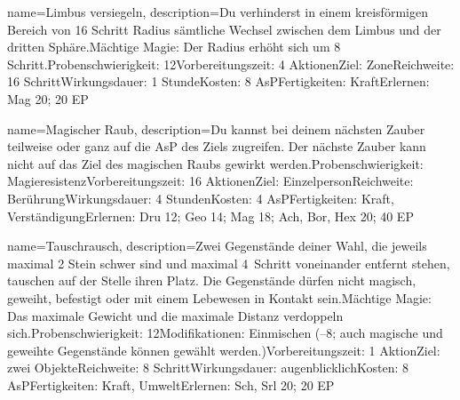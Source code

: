 {
    name={Limbus versiegeln},
    description={Du verhinderst in einem kreisförmigen Bereich von 16 Schritt Radius sämtliche Wechsel zwischen dem Limbus und der dritten Sphäre.\newline Mächtige Magie: Der Radius erhöht sich um 8 Schritt.\newline Probenschwierigkeit: 12\newline Vorbereitungszeit: 4 Aktionen\newline Ziel: Zone\newline Reichweite: 16 Schritt\newline Wirkungsdauer: 1 Stunde\newline Kosten: 8 AsP\newline Fertigkeiten: Kraft\newline Erlernen: Mag 20; 20 EP}
}


{
    name={Magischer Raub},
    description={Du kannst bei deinem nächsten Zauber teilweise oder ganz auf die AsP des Ziels zugreifen. Der nächste Zauber kann nicht auf das Ziel des magischen Raubs gewirkt werden.\newline Probenschwierigkeit: Magieresistenz\newline Vorbereitungszeit: 16 Aktionen\newline Ziel: Einzelperson\newline Reichweite: Berührung\newline Wirkungsdauer: 4 Stunden\newline Kosten: 4 AsP\newline Fertigkeiten: Kraft, Verständigung\newline Erlernen: Dru 12; Geo 14; Mag 18; Ach, Bor, Hex 20; 40 EP}
}


{
    name={Tauschrausch},
    description={Zwei Gegenstände deiner Wahl, die jeweils maximal 2 Stein schwer sind und maximal 4 Schritt voneinander entfernt stehen, tauschen auf der Stelle ihren Platz. Die Gegenstände dürfen nicht magisch, geweiht, befestigt oder mit einem Lebewesen in Kontakt sein.\newline Mächtige Magie: Das maximale Gewicht und die maximale Distanz verdoppeln sich.\newline Probenschwierigkeit: 12\newline Modifikationen: Einmischen (–8; auch magische und geweihte Gegenstände können gewählt werden.)\newline Vorbereitungszeit: 1 Aktion\newline Ziel: zwei Objekte\newline Reichweite: 8 Schritt\newline Wirkungsdauer: augenblicklich\newline Kosten: 8 AsP\newline Fertigkeiten: Kraft, Umwelt\newline Erlernen: Sch, Srl 20; 20 EP}
}


